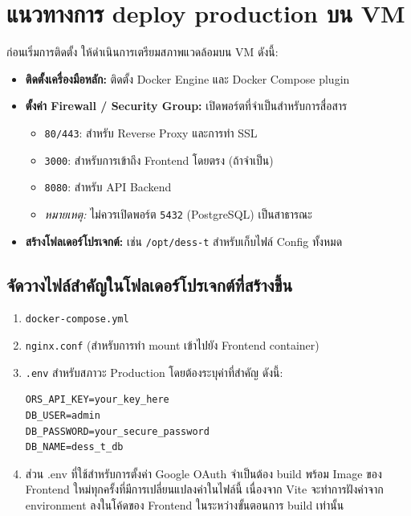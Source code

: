 \section{แนวทางการ deploy production บน VM}
ก่อนเริ่มการติดตั้ง ให้ดำเนินการเตรียมสภาพแวดล้อมบน VM ดังนี้:
\begin{itemize}
    \item \textbf{ติดตั้งเครื่องมือหลัก:} ติดตั้ง Docker Engine และ Docker Compose plugin
    \item \textbf{ตั้งค่า Firewall / Security Group:} เปิดพอร์ตที่จำเป็นสำหรับการสื่อสาร
    \begin{itemize}
        \item \texttt{80/443}: สำหรับ Reverse Proxy และการทำ SSL
        \item \texttt{3000}: สำหรับการเข้าถึง Frontend โดยตรง (ถ้าจำเป็น)
        \item \texttt{8080}: สำหรับ API Backend
        \item \textit{หมายเหตุ:} ไม่ควรเปิดพอร์ต \texttt{5432} (PostgreSQL) เป็นสาธารณะ
    \end{itemize}
    \item \textbf{สร้างโฟลเดอร์โปรเจกต์:} เช่น \texttt{/opt/dess-t} สำหรับเก็บไฟล์ Config ทั้งหมด
\end{itemize}

\subsection{จัดวางไฟล์สำคัญในโฟลเดอร์โปรเจกต์ที่สร้างขึ้น}
\begin{enumerate}
    \item \texttt{docker-compose.yml}
    \item \texttt{nginx.conf} (สำหรับการทำ mount เข้าไปยัง Frontend container)
    \item \texttt{.env} สำหรับสภาวะ Production โดยต้องระบุค่าที่สำคัญ ดังนี้:

\begin{verbatim}
ORS_API_KEY=your_key_here
DB_USER=admin
DB_PASSWORD=your_secure_password
DB_NAME=dess_t_db
\end{verbatim}
    \item ส่วน .env ที่ใช้สำหรับการตั้งค่า Google OAuth จำเป็นต้อง build พร้อม Image ของ Frontend ใหม่ทุกครั้งที่มีการเปลี่ยนแปลงค่าในไฟล์นี้ เนื่องจาก Vite จะทำการฝังค่าจาก environment ลงในโค้ดของ Frontend ในระหว่างขั้นตอนการ build เท่านั้น
\end{enumerate}
